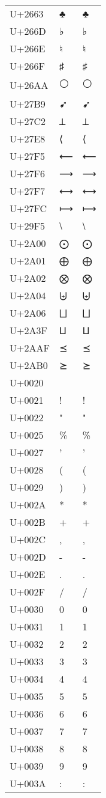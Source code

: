 \documentclass{article}
\begin{document}
\begin{longtable}{lll}
U+2663 & ♣ & ♣ \\
U+266D & ♭ & ♭ \\
U+266E & ♮ & ♮ \\
U+266F & ♯ & ♯ \\
U+26AA & ⚪ & ⚪ \\
U+27B9 & ➹ & ➹ \\
U+27C2 & ⟂ & ⟂ \\
U+27E8 & ⟨ & ⟨ \\
U+27F5 & ⟵ & ⟵ \\
U+27F6 & ⟶ & ⟶ \\
U+27F7 & ⟷ & ⟷ \\
U+27FC & ⟼ & ⟼ \\
U+29F5 & ⧵ & ⧵ \\
U+2A00 & ⨀ & ⨀ \\
U+2A01 & ⨁ & ⨁ \\
U+2A02 & ⨂ & ⨂ \\
U+2A04 & ⨄ & ⨄ \\
U+2A06 & ⨆ & ⨆ \\
U+2A3F & ⨿ & ⨿ \\
U+2AAF & ⪯ & ⪯ \\
U+2AB0 & ⪰ & ⪰ \\
U+0020 &   &   \\
U+0021 & ! & ! \\
U+0022 & " & " \\
U+0025 & \% & \% \\
U+0027 & ' & ' \\
U+0028 & ( & ( \\
U+0029 & ) & ) \\
U+002A & * & * \\
U+002B & + & + \\
U+002C & , & , \\
U+002D & - & - \\
U+002E & . & . \\
U+002F & / & / \\
U+0030 & 0 & 0 \\
U+0031 & 1 & 1 \\
U+0032 & 2 & 2 \\
U+0033 & 3 & 3 \\
U+0034 & 4 & 4 \\
U+0035 & 5 & 5 \\
U+0036 & 6 & 6 \\
U+0037 & 7 & 7 \\
U+0038 & 8 & 8 \\
U+0039 & 9 & 9 \\
U+003A & : & : \\

\end{longtable}
\end{document}

